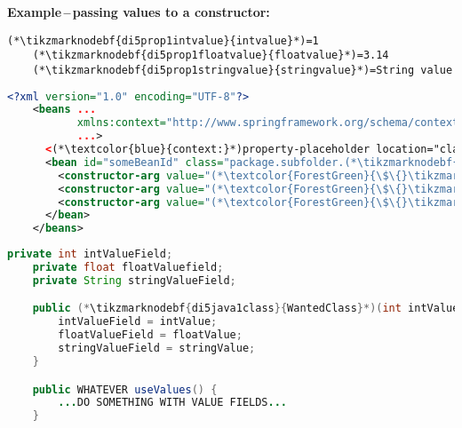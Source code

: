\vspace{\baselineskip}
\noindent \textbf{Example\,--\,passing values to a constructor:}
\begin{lstlisting}[title={A \textit{.properties} file called \tikzmarknodebf{di5prop1filename}{\textit{constructor.properties}}}]
    (*\tikzmarknodebf{di5prop1intvalue}{intvalue}*)=1
    (*\tikzmarknodebf{di5prop1floatvalue}{floatvalue}*)=3.14
    (*\tikzmarknodebf{di5prop1stringvalue}{stringvalue}*)=String value
\end{lstlisting}
\begin{lstlisting}[language=XML, title={Configuration XML}]
    <?xml version="1.0" encoding="UTF-8"?>
    <beans ...
           xmlns:context="http://www.springframework.org/schema/context"
           ...>
      <(*\textcolor{blue}{context:}*)property-placeholder location="classpath:(*\tikzmarknodebf{di5xml1filename}{constructor.properties}[ForestGreen]*)"/>
      <bean id="someBeanId" class="package.subfolder.(*\tikzmarknodebf{di5xml1class}{WantedClass}[ForestGreen]*)">
        <constructor-arg value="(*\textcolor{ForestGreen}{\$\{}\tikzmarknodebf{di5xml1intvalue}{intvalue}[ForestGreen]\textcolor{ForestGreen}{\}}*)"/>
        <constructor-arg value="(*\textcolor{ForestGreen}{\$\{}\tikzmarknodebf{di5xml1floatvalue}{floatvalue}[ForestGreen]\textcolor{ForestGreen}{\}}*)"/>
        <constructor-arg value="(*\textcolor{ForestGreen}{\$\{}\tikzmarknodebf{di5xml1stringvalue}{stringvalue}[ForestGreen]\textcolor{ForestGreen}{\}}*)"/>
      </bean>
    </beans>
\end{lstlisting}
\begin{lstlisting}[language=Java, title={Wanted class with the constructor}]
    private int intValueField;
    private float floatValuefield;
    private String stringValueField;

    public (*\tikzmarknodebf{di5java1class}{WantedClass}*)(int intValue, float floatValue, String stringValue) {
        intValueField = intValue;
        floatValueField = floatValue;
        stringValueField = stringValue;
    }

    public WHATEVER useValues() {
        ...DO SOMETHING WITH VALUE FIELDS...
    }
\end{lstlisting}
\newpage

